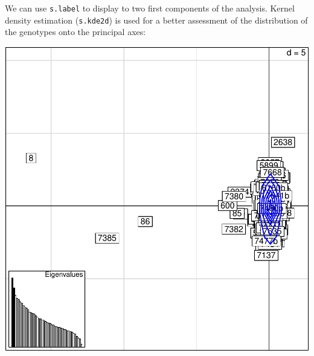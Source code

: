 \documentclass{article}
\begin{document}
We can use \texttt{s.label} to display to two first components of the analysis.
Kernel density estimation (\texttt{s.kde2d}) is used for a better
assessment of the distribution of the genotypes onto the principal axes:
\begin{Schunk}
\end{Schunk}
\includegraphics{figs/spca-034}
\end{document}

